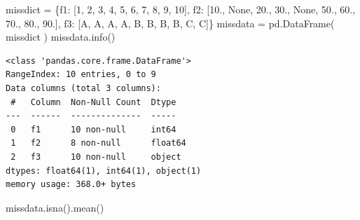 \documentclass[
  a4paper,
  DIV=11,
  numbers=noendperiod]{scrreprt}
\newenvironment{Shaded}{\begin{snugshade}}{\end{snugshade}}
\newcommand{\DecValTok}[1]{\textcolor[rgb]{0.68,0.00,0.00}{#1}}
\newcommand{\FloatTok}[1]{\textcolor[rgb]{0.68,0.00,0.00}{#1}}
\newcommand{\NormalTok}[1]{\textcolor[rgb]{0.00,0.23,0.31}{#1}}
\newcommand{\OperatorTok}[1]{\textcolor[rgb]{0.37,0.37,0.37}{#1}}
\newcommand{\StringTok}[1]{\textcolor[rgb]{0.13,0.47,0.30}{#1}}
\newcommand{\VariableTok}[1]{\textcolor[rgb]{0.07,0.07,0.07}{#1}}
\begin{document}
\begin{Shaded}
\begin{Highlighting}[]
\NormalTok{missdict }\OperatorTok{=}\NormalTok{ \{}\StringTok{\textquotesingle{}f1\textquotesingle{}}\NormalTok{: [}\DecValTok{1}\NormalTok{, }\DecValTok{2}\NormalTok{, }\DecValTok{3}\NormalTok{, }\DecValTok{4}\NormalTok{, }\DecValTok{5}\NormalTok{, }\DecValTok{6}\NormalTok{, }\DecValTok{7}\NormalTok{, }\DecValTok{8}\NormalTok{, }\DecValTok{9}\NormalTok{, }\DecValTok{10}\NormalTok{],}
            \StringTok{\textquotesingle{}f2\textquotesingle{}}\NormalTok{: [}\FloatTok{10.}\NormalTok{, }\VariableTok{None}\NormalTok{, }\FloatTok{20.}\NormalTok{, }\FloatTok{30.}\NormalTok{, }\VariableTok{None}\NormalTok{, }\FloatTok{50.}\NormalTok{, }\FloatTok{60.}\NormalTok{, }\FloatTok{70.}\NormalTok{, }\FloatTok{80.}\NormalTok{, }\FloatTok{90.}\NormalTok{],}
            \StringTok{\textquotesingle{}f3\textquotesingle{}}\NormalTok{: [}\StringTok{\textquotesingle{}A\textquotesingle{}}\NormalTok{, }\StringTok{\textquotesingle{}A\textquotesingle{}}\NormalTok{, }\StringTok{\textquotesingle{}A\textquotesingle{}}\NormalTok{, }\StringTok{\textquotesingle{}A\textquotesingle{}}\NormalTok{, }\StringTok{\textquotesingle{}B\textquotesingle{}}\NormalTok{, }\StringTok{\textquotesingle{}B\textquotesingle{}}\NormalTok{, }\StringTok{\textquotesingle{}B\textquotesingle{}}\NormalTok{, }\StringTok{\textquotesingle{}B\textquotesingle{}}\NormalTok{, }\StringTok{\textquotesingle{}C\textquotesingle{}}\NormalTok{, }\StringTok{\textquotesingle{}C\textquotesingle{}}\NormalTok{]\}}
\NormalTok{missdata }\OperatorTok{=}\NormalTok{ pd.DataFrame( missdict )}
\NormalTok{missdata.info()}
\end{Highlighting}
\end{Shaded}

\begin{verbatim}
<class 'pandas.core.frame.DataFrame'>
RangeIndex: 10 entries, 0 to 9
Data columns (total 3 columns):
 #   Column  Non-Null Count  Dtype  
---  ------  --------------  -----  
 0   f1      10 non-null     int64  
 1   f2      8 non-null      float64
 2   f3      10 non-null     object 
dtypes: float64(1), int64(1), object(1)
memory usage: 368.0+ bytes
\end{verbatim}

\begin{Shaded}
\begin{Highlighting}[]
\NormalTok{missdata.isna().mean()}
\end{Highlighting}
\end{Shaded}
\end{document}
